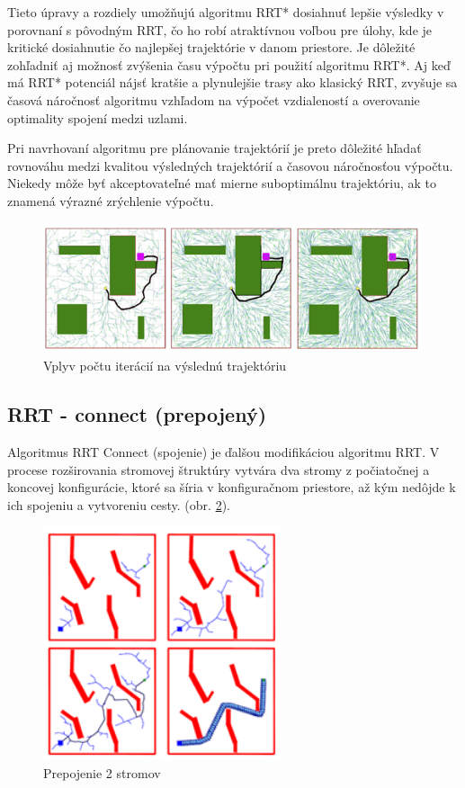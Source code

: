 Tieto úpravy a rozdiely umožňujú algoritmu RRT* dosiahnuť lepšie výsledky v porovnaní s pôvodným RRT, čo ho robí atraktívnou voľbou pre úlohy, kde je kritické dosiahnutie čo najlepšej trajektórie v danom priestore. Je dôležité zohľadniť aj možnosť zvýšenia času výpočtu pri použití algoritmu RRT*. Aj keď má RRT* potenciál nájsť kratšie a plynulejšie trasy ako klasický RRT, zvyšuje sa časová náročnosť algoritmu vzhľadom na výpočet vzdialeností a overovanie optimality spojení medzi uzlami.

Pri navrhovaní algoritmu pre plánovanie trajektórií je preto dôležité hľadať rovnováhu medzi kvalitou výsledných trajektórií a časovou náročnosťou výpočtu. Niekedy môže byť akceptovateľné mať mierne suboptimálnu trajektóriu, ak to znamená výrazné zrýchlenie výpočtu. 

\begin{figure}[h]
	\centering
	\includegraphics[width=160mm]{img/RRT2.png}
	\caption{Vplyv počtu iterácií na výslednú trajektóriu \cite{RRT-Kuffner}}\label{OBRAZOK 1.2.2} 
\end{figure} 

\subsection{RRT - connect (prepojený)}
\label{kap:2.3}
Algoritmus RRT Connect (spojenie) je ďalšou modifikáciou algoritmu RRT. V procese rozširovania stromovej štruktúry vytvára dva stromy z počiatočnej a koncovej konfigurácie, ktoré sa šíria v konfiguračnom priestore, až kým nedôjde k ich spojeniu a vytvoreniu cesty. (obr. \ref{OBRAZOK 1.2.3}). 

\begin{figure}[h!]
	\centering
	\includegraphics[width=70mm]{img/RRT-connect.png}
	\caption{Prepojenie 2 stromov \cite{RRT-Kuffner}}\label{OBRAZOK 1.2.3} 
\end{figure} 

